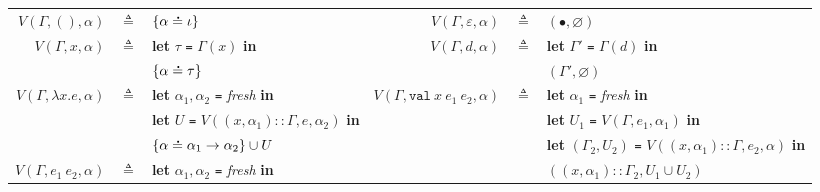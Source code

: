 \documentclass{article}
\theoremstyle{definition}
\newcommand*{\cons}{::}
\newcommand*{\A}[1]{\overset{\,_{\mbox{\Large .}}}{#1}}
\newcommand*{\modid}{d}
\newcommand*{\Lete}{\mathtt{val}}
\begin{document}
\begin{flushright}\end{flushright}
\hspace{-2.5em}
\begin{tabular}{rclrcl}
  $V(\Gamma,(),\alpha)$              & $\triangleq$ & $\{\alpha\A{=}\iota\}$                                                          & $V(\Gamma,\varepsilon,\alpha)$             & $\triangleq$ & $(\bullet,\varnothing)$                                                                           \\
  $V(\Gamma,x,\alpha)$               & $\triangleq$ & \textbf{let} $\tau$ \texttt{=} $\Gamma(x)$ \textbf{in}                          & $V(\Gamma,\modid,\alpha)$                  & $\triangleq$ & \textbf{let} $\Gamma'$ \texttt{=} $\Gamma(d)$ \textbf{in}                                         \\
                                     &              & $\{\alpha\A{=}\tau\}$                                                           &                                            &              & $(\Gamma',\varnothing)$                                                                           \\
  $V(\Gamma,\lambda x.e,\alpha)$     & $\triangleq$ & \textbf{let} $\alpha_1,\alpha_2$ \texttt{=} \textit{fresh} \textbf{in}          & $V(\Gamma,\Lete\:x\:e_1\:e_2,\alpha)$      & $\triangleq$ & \textbf{let} $\alpha_1$ \texttt{=} \textit{fresh} \textbf{in}                                     \\
                                     &              & \textbf{let} $U$ \texttt{=} $V((x,\alpha_1)\cons\Gamma,e,\alpha_2)$ \textbf{in} &                                            &              & \textbf{let} $U_1$ \texttt{=} $V(\Gamma,e_1,\alpha_1)$ \textbf{in}                                \\
                                     &              & $\{\alpha\A{=}\alpha_1\rightarrow\alpha_2\}\cup U$                              &                                            &              & \textbf{let} $(\Gamma_2,U_2)$ \texttt{=} $V((x,\alpha_1)\cons\Gamma,e_2,\alpha)$ \textbf{in}      \\
  $V(\Gamma,e_1\:e_2,\alpha)$        & $\triangleq$ & \textbf{let} $\alpha_1,\alpha_2$ \texttt{=} \textit{fresh} \textbf{in}          &                                            &              & $((x,\alpha_1)\cons\Gamma_2,U_1\cup U_2)$                                                         \\

\end{tabular}
\end{document}
